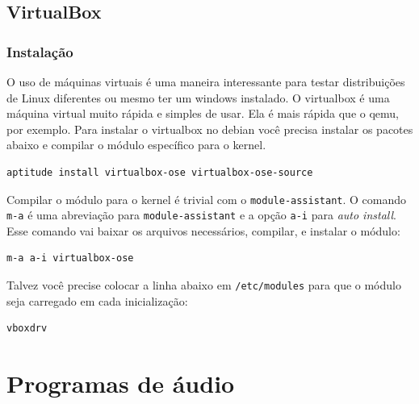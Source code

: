 \documentclass[12pt,brazil]{book}
\begin{document}


\chapter{VirtualBox}
\label{cha:virtualbox}

\section{Instalação}
\label{sec:instalacao-6}

O uso de máquinas virtuais é uma maneira interessante para testar
distribuições de Linux diferentes ou mesmo ter um windows instalado.
O virtualbox é uma máquina virtual muito rápida e simples de usar. Ela
é mais rápida que o qemu, por exemplo. Para instalar o virtualbox no
debian você precisa instalar os pacotes abaixo e compilar o módulo
específico para o kernel.

\begin{verbatim}
aptitude install virtualbox-ose virtualbox-ose-source
\end{verbatim}

Compilar o módulo para o kernel é trivial com o
\texttt{module-assistant}. O comando \texttt{m-a} é uma abreviação
para \texttt{module-assistant} e a opção \texttt{a-i} para
\textit{auto install}. Esse comando vai baixar os arquivos
necessários, compilar, e instalar o módulo:

\begin{verbatim}
m-a a-i virtualbox-ose
\end{verbatim}

Talvez você precise colocar a linha abaixo em \texttt{/etc/modules}
para que o módulo seja carregado em cada inicialização:

\begin{verbatim}
vboxdrv
\end{verbatim}

\part{Programas de áudio}
\label{part:programas-de-audio}
\end{document}

